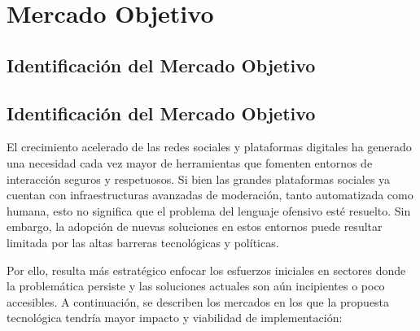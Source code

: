 \chapter{Mercado Objetivo}

\section{Identificación del Mercado Objetivo}

\section{Identificación del Mercado Objetivo}

El crecimiento acelerado de las redes sociales y plataformas digitales ha generado una necesidad cada vez mayor de herramientas que fomenten entornos de interacción seguros y respetuosos. Si bien las grandes plataformas sociales ya cuentan con infraestructuras avanzadas de moderación, tanto automatizada como humana, esto no significa que el problema del lenguaje ofensivo esté resuelto. Sin embargo, la adopción de nuevas soluciones en estos entornos puede resultar limitada por las altas barreras tecnológicas y políticas.

Por ello, resulta más estratégico enfocar los esfuerzos iniciales en sectores donde la problemática persiste y las soluciones actuales son aún incipientes o poco accesibles. A continuación, se describen los mercados en los que la propuesta tecnológica tendría mayor impacto y viabilidad de implementación:

